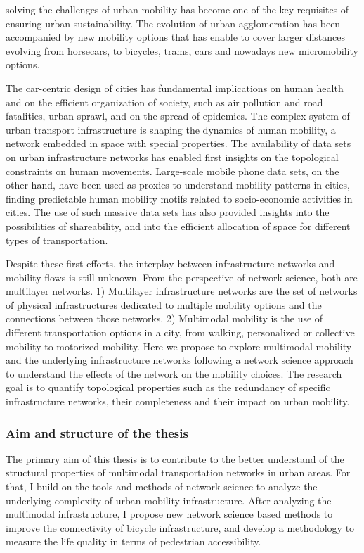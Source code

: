 solving the challenges of urban mobility has become one of the key requisites of ensuring urban sustainability. The evolution of urban agglomeration has been accompanied by new mobility options that has enable to cover larger distances evolving from horsecars, to bicycles, trams, cars and nowadays new micromobility options. 


The car-centric design of cities has fundamental implications on human health and on the efficient organization of society, such as air pollution and road fatalities, urban sprawl, and on the spread of epidemics. The complex system of urban transport infrastructure is shaping the dynamics of human mobility, a network embedded in space with special properties. The availability of data sets on urban infrastructure networks has enabled first insights on the topological constraints on human movements. Large-scale mobile phone data sets, on the other hand, have been used as proxies to understand mobility patterns in cities, finding predictable human mobility motifs related to socio-economic activities in cities. The use of such massive data sets has also provided insights into the possibilities of shareability, and into the efficient allocation of space for different types of transportation.

Despite these first efforts, the interplay between infrastructure networks and mobility flows is still unknown. From the perspective of network science, both are multilayer networks. 1) Multilayer infrastructure networks are the set of networks of physical infrastructures dedicated to multiple mobility options and the connections between those networks. 2) Multimodal mobility is the use of different transportation options in a city, from walking, personalized or collective mobility to motorized mobility.
Here we propose to explore multimodal mobility and the underlying infrastructure networks following a network science approach to understand the effects of the network on the mobility choices. The research goal is to quantify topological properties such as the redundancy of specific infrastructure networks, their completeness and their impact on urban mobility. 

\subsubsection{Aim and structure of the thesis}
The primary aim of this thesis is to contribute to the better understand of the structural properties of multimodal transportation networks in urban areas. For that, I build on the tools and methods of network science to analyze the underlying complexity of urban mobility infrastructure. After analyzing the multimodal infrastructure, I propose new network science based methods to improve the connectivity of bicycle infrastructure, and develop a methodology to measure the life quality in terms of pedestrian accessibility.


